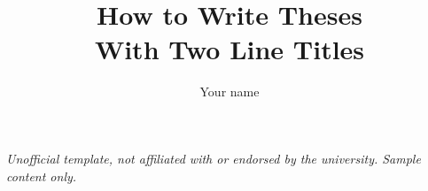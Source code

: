 \documentclass[12pt]{report}
\begin{document}
{\footnotesize\itshape Unofficial template, not affiliated with or endorsed by the university. Sample content only.\par}
\title{How to Write Theses\\
            With Two Line Titles}
\author{Your name}
 

\beforepreface


\afterpreface






\onlinesignature
\end{document}
